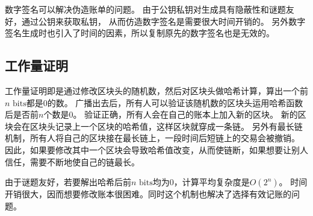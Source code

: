 \documentclass[UTF8,12pt]{article}
\begin{document}
        数字签名可以解决伪造账单的问题。
        由于公钥私钥对生成具有隐蔽性和谜题友好，通过公钥来获取私钥，
        从而仿造数字签名是需要很大时间开销的。
        另外数字签名生成时也引入了时间的因素，所以复制原先的数字签名也是无效的。
        \subsection{工作量证明}
        工作量证明即是通过修改区块头的随机数，然后对区块头做哈希计算，算出一个前$n\text{ bits}$都是$0$的数。
        广播出去后，所有人可以验证该随机数的区块头运用哈希函数后是否前$n$个数是0。
        验证正确，所有人会在自己的账本上加入新的区块。
        新的区块会在区块头记录上一个区块的哈希值，这样区块就穿成一条链。
        另外有最长链机制，所有人将自己的区块接在最长链上，一段时间后短链上的交易会被撤销。
        因此，如果要修改其中一个区块会导致哈希值改变，从而使链断，如果想要让别人信任，需要不断地使自己的链最长。

        由于谜题友好，若要解出哈希后前$n\text{ bits}$均为$0$，计算平均复杂度是$O(2^n)$。
        时间开销很大，因而想要修改账本很困难。同时这个机制也解决了选择有效记账的问题。
\end{document}
